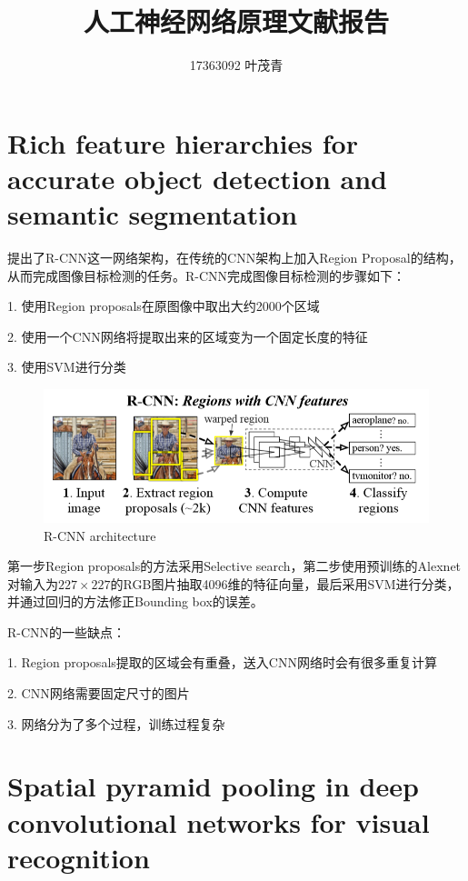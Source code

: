 \documentclass[12pt,onecolumn]{article}
\begin{document}
    \title{人工神经网络原理文献报告}
    \author{17363092 叶茂青}

    \maketitle

    \section{Rich feature hierarchies for accurate object detection and semantic segmentation\cite{girshick2014rich}}
    提出了R-CNN这一网络架构，在传统的CNN架构上加入Region Proposal的结构，从而完成图像目标检测的任务。R-CNN完成图像目标检测的步骤如下：

    1. 使用Region proposals在原图像中取出大约2000个区域

    2. 使用一个CNN网络将提取出来的区域变为一个固定长度的特征

    3. 使用SVM进行分类

    \begin{figure}[htb]
        \centering
        \includegraphics[width=\linewidth]{figure/rcnn.png}
        \caption{R-CNN architecture}
    \end{figure}

    第一步Region proposals的方法采用Selective search，第二步使用预训练的Alexnet对输入为$227\times 227$的RGB图片抽取4096维的特征向量，最后采用SVM进行分类，并通过回归的方法修正Bounding box的误差。

    R-CNN的一些缺点：

    1. Region proposals提取的区域会有重叠，送入CNN网络时会有很多重复计算

    2. CNN网络需要固定尺寸的图片

    3. 网络分为了多个过程，训练过程复杂

    \section{Spatial pyramid pooling in deep convolutional networks for visual recognition\cite{he2015spatial}}
\end{document}
